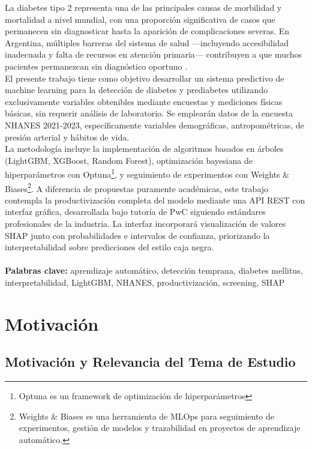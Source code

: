 \documentclass[12pt, a4paper]{report}
\begin{document}
La diabetes tipo 2 representa una de las principales causas de morbilidad y mortalidad a nivel mundial, con una proporción significativa de casos que permanecen sin diagnosticar hasta la aparición de complicaciones severas. En Argentina, múltiples barreras del sistema de salud —incluyendo accesibilidad inadecuada y falta de recursos en atención primaria— contribuyen a que muchos pacientes permanezcan sin diagnóstico oportuno \citep{belizan2020barriers}. \\
El presente trabajo tiene como objetivo desarrollar un sistema predictivo de machine learning para la detección de diabetes y prediabetes utilizando exclusivamente variables obtenibles mediante encuestas y mediciones físicas básicas, sin requerir análisis de laboratorio. Se emplearán datos de la encuesta NHANES 2021-2023, específicamente variables demográficas, antropométricas, de presión arterial y hábitos de vida.\\
La metodología incluye la implementación de algoritmos basados en árboles (LightGBM, XGBoost, Random Forest), optimización bayesiana de hiperparámetros con Optuna\footnote{Optuna es un framework de optimización de hiperparámetros}, y seguimiento de experimentos con Weights \& Biases\footnote{Weights \& Biases es una herramienta de MLOps para seguimiento de experimentos, gestión de modelos y trazabilidad en proyectos de aprendizaje automático.}. A diferencia de propuestas puramente académicas, este trabajo contempla la productivización completa del modelo mediante una API REST con interfaz gráfica, desarrollada bajo tutoría de PwC siguiendo estándares profesionales de la industria. La interfaz incorporará visualización de valores SHAP junto con probabilidades e intervalos de confianza, priorizando la interpretabilidad sobre predicciones del estilo caja negra.\\
\\
\textbf{Palabras clave:} aprendizaje automático, detección temprana, diabetes mellitus, interpretabilidad, LightGBM, NHANES, productivización, screening, SHAP

\chapter{Motivación}

\section{Motivación y Relevancia del Tema de Estudio}
\end{document}
